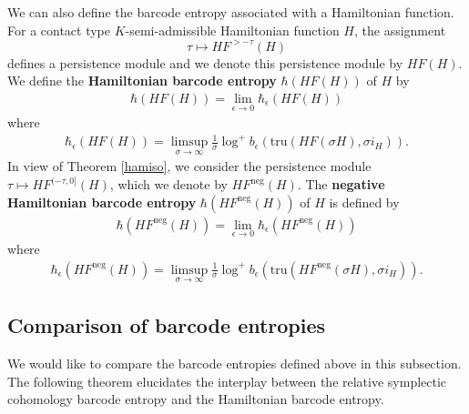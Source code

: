 \documentclass[12pt]{amsart}
\theoremstyle{definition}
\newcommand{\ZZ}{{\mathbb Z}}
\begin{document}
We can also define the barcode entropy associated with a Hamiltonian function. For a contact type $K$-semi-admissible Hamiltonian function $H$, the assignment $$\tau \mapsto HF^{>-\tau}(H)$$ defines a persistence module and we denote this persistence module by $HF(H)$. We define the \textbf{Hamiltonian barcode entropy} $\hbar(HF(H))$ of $H$ by
\begin{align*}
    \hbar(HF(H)) = \lim_{\epsilon \to 0} \hbar_\epsilon(HF(H))
\end{align*}
where
\begin{align*}
    \hbar_\epsilon(HF(H)) = \limsup_{\sigma \to \infty} \frac{1}{\sigma} \log^+ b_\epsilon \left( \textrm{tru} (HF(\sigma H), \sigma i_H) \right).
\end{align*}
In view of Theorem \ref{hamiso}, we consider the persistence module $\tau \mapsto HF^{(-\tau,0]}(H)$, which we denote by $HF^{\textrm{neg}}(H)$. The \textbf{negative Hamiltonian barcode entropy} $\hbar(HF^{\textrm{neg}}(H))$ of $H$ is defined by
\begin{align*}
    \hbar(HF^{\textrm{neg}}(H)) = \lim_{\epsilon \to 0}\hbar_\epsilon(HF^{\textrm{neg}}(H))
\end{align*}
where
\begin{align*}
    \hbar_\epsilon(HF^{\textrm{neg}}(H)) = \limsup_{\sigma \to \infty} \frac{1}{\sigma} \log^+ b_\epsilon \left( \textrm{tru} (HF^{\textrm{neg}}(\sigma H), \sigma i_H) \right).
\end{align*}

\vspace{0.2 cm}
\subsection{Comparison of barcode entropies}
We would like to compare the barcode entropies defined above in this subsection. The following theorem elucidates the interplay between the relative symplectic cohomology barcode entropy and the Hamiltonian barcode entropy.
 
\end{document}
